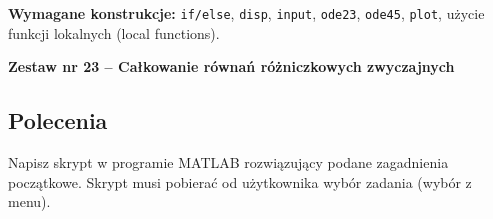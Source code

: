 \documentclass[a4paper,11pt]{article}
\begin{document}
\vspace{0.3cm}
\begin{ramka}
\textbf{Wymagane konstrukcje:}
\texttt{if/else}, \texttt{disp}, \texttt{input}, \texttt{ode23}, \texttt{ode45}, \texttt{plot}, użycie funkcji lokalnych (local functions).
\end{ramka}

\clearpage
\begin{center}
  {\large\bfseries Zestaw nr 23 \quad -- \quad Całkowanie równań różniczkowych zwyczajnych}
\end{center}
\hrulefill
\vspace{0.4cm}

\subsection*{Polecenia}

Napisz skrypt w programie MATLAB rozwiązujący podane zagadnienia początkowe. Skrypt musi pobierać od użytkownika wybór zadania (wybór z menu).
\end{document}
